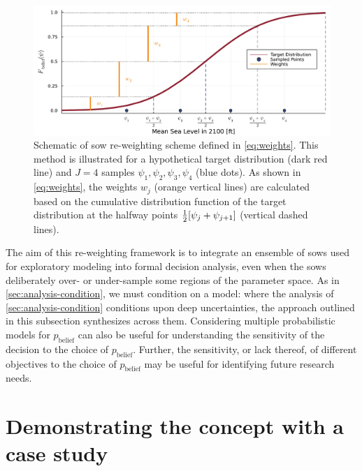 \documentclass{agujournal2019}
\begin{document}
\begin{figure}
  \centering
  \includegraphics[width=\textwidth]{grid-sketch}
  \caption{
    Schematic of \gls{sow} re-weighting scheme defined in \cref{eq:weights}.
    This method is illustrated for a hypothetical target distribution (dark red line) and $J=4$ samples $\psi_1, \psi_2, \psi_3, \psi_4$ (blue dots).
    As shown in \cref{eq:weights}, the weights $w_j$ (orange vertical lines) are calculated based on the cumulative distribution function of the target distribution at the halfway points $\frac{1}{2}\qty[\psi_j+\psi_{j+1}]$ (vertical dashed lines).
  }\label{fig:grid-sketch}
\end{figure}

The aim of this re-weighting framework is to integrate an ensemble of \glspl{sow} used for exploratory modeling into formal decision analysis, even when the \glspl{sow} deliberately over- or under-sample some regions of the parameter space.
As in \cref{sec:analysis-condition}, we must condition on a model: where the analysis of \cref{sec:analysis-condition} conditions upon deep uncertainties, the approach outlined in this subsection synthesizes across them.
Considering multiple probabilistic models for $p_\mathrm{belief}$ can also be useful for understanding the sensitivity of the decision to the choice of $p_\mathrm{belief}$.
Further, the sensitivity, or lack thereof, of different objectives to the choice of $p_\mathrm{belief}$ may be useful for identifying future research needs.

\section{Demonstrating the concept with a case study}\label{sec:case-study}
\end{document}
